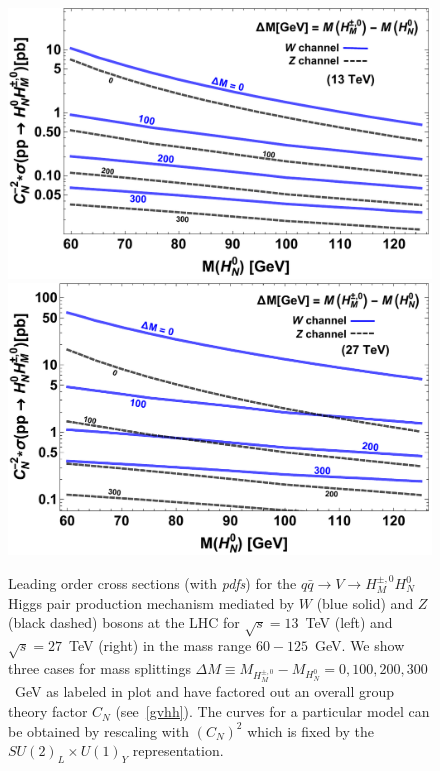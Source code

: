 \documentclass[../report.tex]{subfiles}
\begin{document}
\begin{figure}[tbh]
\begin{center}
\includegraphics[scale=.403]{section9/FigsLowMassHiggs/CxnVsMHoDelM_13TeV.pdf}
\includegraphics[scale=.4]{section9/FigsLowMassHiggs/CxnVsMHoDelM_27TeV.pdf}
\end{center}
\caption{Leading order cross sections (with \emph{pdfs}) for the $q\bar{q} \to V \to H_M^{\pm,0} H_N^0$ Higgs pair production mechanism mediated by $W$ (blue solid) and $Z$ (black dashed) bosons at the LHC for $\sqrt{s}=13$~TeV (left) and $\sqrt{s}=27$~TeV (right) in the mass range $60 - 125$~GeV. We show three cases for mass splittings $\Delta M \equiv M_{H^{\pm,0}_M} - M_{H_N^0}= 0, 100, 200, 300$~GeV as labeled in plot and have factored out an overall group theory factor $C_N$ (see~\ref{gvhh}). The curves for a particular model can be obtained by rescaling with $(C_N)^2$ which is fixed by the $SU(2)_L\times U(1)_Y$ representation.} 
\label{fig:HHprod}
\end{figure}
\end{document}
